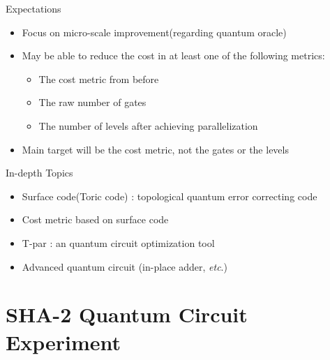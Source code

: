 \documentclass{beamer}
\begin{document}
    \begin{frame}{Expectations}
      \begin{itemize}
        \item Focus on micro-scale improvement(regarding quantum oracle)
        \item May be able to reduce the cost in at least one of the following metrics:
          \begin{itemize}
            \item The cost metric from before
            \item The raw number of gates
            \item The number of levels after achieving parallelization
          \end{itemize}
        \item Main target will be the cost metric, not the gates or the levels
      \end{itemize}
    \end{frame}
    
    \begin{frame}{In-depth Topics}
        \begin{itemize}
            \item Surface code(Toric code) : topological quantum error correcting code
            \item Cost metric based on surface code
            \item T-par \cite{amy2014polynomial} : an quantum circuit optimization tool
            \item Advanced quantum circuit (in-place adder, \textit{etc}.)
        \end{itemize}
    \end{frame}
    
    
    \section{SHA-2 Quantum Circuit Experiment}
    
    
\end{document}
